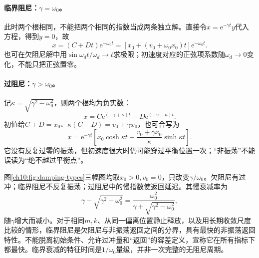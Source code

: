 \paragraph{临界阻尼：$\gamma=\omega_0$。}
此时两个根相同，不能把两个相同的指数当成两条独立解。直接令$x=\mathrm e^{-\gamma t}y$代入方程，得到$\ddot y=0$，故
\begin{equation}\label{ch10:eq:critical}
 x=(C+Dt)\mathrm e^{-\omega_0t}
 =[x_0+(v_0+\omega_0x_0)t]\mathrm e^{-\omega_0t}.
\end{equation}
也可在欠阻尼解中用$\sin\omega_dt/\omega_d\to t$求极限；初速度对应的正弦项系数随$\omega_d\to0$变化，不能只把正弦置零。

\paragraph{过阻尼：$\gamma>\omega_0$。}
记$\kappa=\sqrt{\gamma^2-\omega_0^2}$，则两个根均为负实数：
\begin{equation}\label{ch10:eq:over}
 x=C\mathrm e^{(-\gamma+\kappa)t}+D\mathrm e^{(-\gamma-\kappa)t}.
\end{equation}
初值给$C+D=x_0$、$\kappa(C-D)=v_0+\gamma x_0$，也可合写为
\[
 x=\mathrm e^{-\gamma t}\left[x_0\cosh\kappa t+
 \frac{v_0+\gamma x_0}{\kappa}\sinh\kappa t\right].
\]
它没有反复过零的振荡，但初速度很大时仍可能穿过平衡位置一次；“非振荡”不能误读为“绝不越过平衡点”。

\chTenDampingFigure
图\ref{ch10:fig:damping-types}三幅图均取$x_0>0,v_0=0$，只改变$\gamma/\omega_0$。欠阻尼有过冲；临界阻尼不反复振荡；过阻尼中的慢指数使返回延迟。其慢衰减率为
\[
 \gamma-\sqrt{\gamma^2-\omega_0^2}
 =\frac{\omega_0^2}{\gamma+\sqrt{\gamma^2-\omega_0^2}},
\]
随$\gamma$增大而减小。对于相同$m,k$、从同一偏离位置静止释放，以及用长期收敛尺度比较的情形，临界阻尼是欠阻尼与非振荡返回之间的分界，具有最快的非振荡返回特性。不能脱离初始条件、允许过冲量和“返回”的容差定义，宣称它在所有指标下都最快。临界衰减的特征时间是$1/\omega_0$量级，并非一次完整的无阻尼周期。

